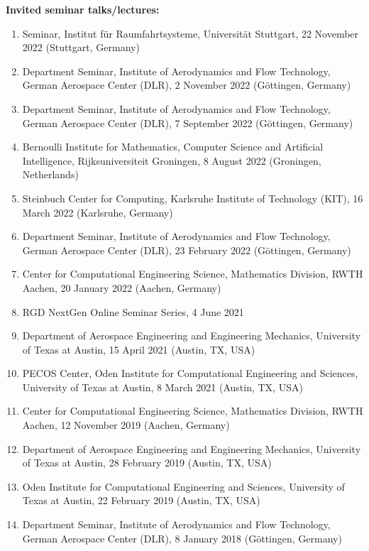 \documentclass{resume} %
\begin{document}
{\bf Invited seminar talks/lectures:}
\begin{enumerate}
    \item Seminar, Institut f\"{u}r Raumfahrtsysteme, Universit\"{a}t Stuttgart, 22 November 2022 (Stuttgart, Germany)
    \item Department Seminar, Institute of Aerodynamics and Flow Technology, German Aerospace Center (DLR), 2 November 2022 (G\"{o}ttingen, Germany)
    \item Department Seminar, Institute of Aerodynamics and Flow Technology, German Aerospace Center (DLR), 7 September 2022 (G\"{o}ttingen, Germany)
    \item Bernoulli Institute for Mathematics, Computer Science and Artificial Intelligence, Rijksuniversiteit Groningen, 8 August 2022 (Groningen, Netherlands)
    \item Steinbuch Center for Computing, Karlsruhe Institute of Technology (KIT), 16 March 2022 (Karlsruhe, Germany)
    \item Department Seminar, Institute of Aerodynamics and Flow Technology, German Aerospace Center (DLR), 23 February 2022 (G\"{o}ttingen, Germany)
    \item Center for Computational Engineering Science, Mathematics Division, RWTH Aachen, 20 January 2022 (Aachen, Germany)
    \item RGD NextGen Online Seminar Series, 4 June 2021
    \item Department of Aerospace Engineering and Engineering Mechanics, University of Texas at Austin, 15 April 2021 (Austin, TX, USA)
    \item PECOS Center, Oden Institute for Computational Engineering and Sciences, University of Texas at Austin, 8 March 2021 (Austin, TX, USA)
    \item Center for Computational Engineering Science, Mathematics Division, RWTH Aachen, 12 November 2019 (Aachen, Germany)
    \item Department of Aerospace Engineering and Engineering Mechanics, University of Texas at Austin, 28 February 2019 (Austin, TX, USA)
    \item Oden Institute for Computational Engineering and Sciences, University of Texas at Austin, 22 February 2019 (Austin, TX, USA)
    \item Department Seminar, Institute of Aerodynamics and Flow Technology, German Aerospace Center (DLR), 8 January 2018 (G\"{o}ttingen, Germany)
\end{enumerate}
\end{document}
